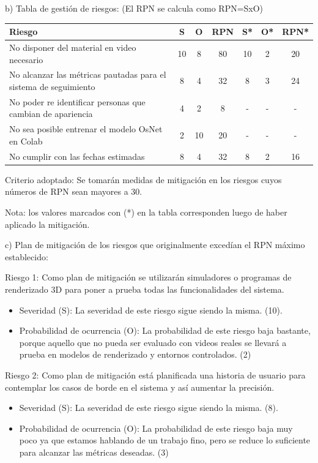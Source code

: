 \documentclass[11pt]{charter}
\begin{document}
b) Tabla de gestión de riesgos:      (El RPN se calcula como RPN=SxO)

\begin{table}[htpb]
\centering
\begin{tabularx}{\linewidth}{@{}|X|c|c|c|c|c|c|@{}}
\hline
\rowcolor[HTML]{C0C0C0} 
Riesgo & S & O & RPN & S* & O* & RPN* \\ \hline
   No disponer del material en video necesario    & 10  & 8   &  80   &  10  &  2  &  20    \\ \hline
   No alcanzar las métricas pautadas para el sistema de seguimiento    &  8  & 4   &  32   &  8  &   3 &   24   \\ \hline
   No poder re identificar personas que cambian de apariencia    &  4  & 2   &   8  &   - &  -  &  -    \\ \hline
   No sea posible entrenar el modelo OsNet en Colab    &  2  & 10  &  20   &  -  & -   &  -    \\ \hline
   No cumplir con las fechas estimadas    &  8  & 4   &  32   &  8  & 2   &  16    \\ \hline
\end{tabularx}%
\end{table}

Criterio adoptado: 
Se tomarán medidas de mitigación en los riesgos cuyos números de RPN sean mayores a 30.

Nota: los valores marcados con (*) en la tabla corresponden luego de haber aplicado la mitigación.

c) Plan de mitigación de los riesgos que originalmente excedían el RPN máximo establecido:

Riesgo 1: Como plan de mitigación se utilizarán simuladores o programas de renderizado 3D para poner a prueba todas las funcionalidades del sistema.
\begin{itemize}
\item Severidad (S): La severidad de este riesgo sigue siendo la misma. (10).
\item Probabilidad de ocurrencia (O): La probabilidad de este riesgo baja bastante, porque aquello que no pueda ser evaluado con videos reales se llevará a prueba en modelos de renderizado y entornos controlados. (2)
\end{itemize}

Riesgo 2: Como plan de mitigación está planificada una historia de usuario para contemplar los casos de borde en el sistema y así aumentar la precisión.
\begin{itemize}
\item Severidad (S): La severidad de este riesgo sigue siendo la misma. (8).
\item Probabilidad de ocurrencia (O): La probabilidad de este riesgo baja muy poco ya que estamos hablando de un trabajo fino, pero se reduce lo suficiente para alcanzar las métricas deseadas. (3)
\end{itemize}
\end{document}
